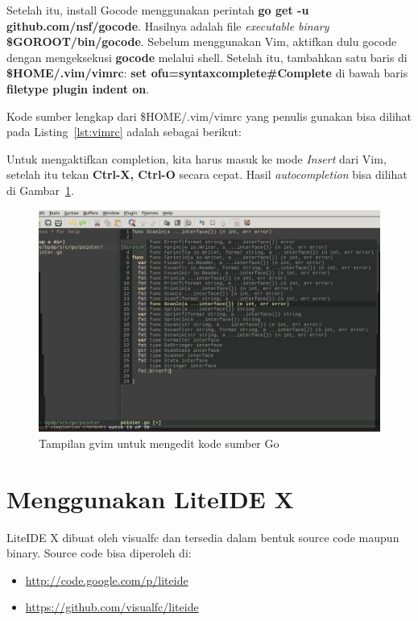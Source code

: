 Setelah itu, install Gocode menggunakan perintah \textbf{go get -u github.com/nsf/gocode}. Hasilnya adalah file \textit{executable binary} \textbf{\$GOROOT/bin/gocode}. Sebelum menggunakan Vim, aktifkan dulu gocode dengan mengeksekusi \textbf{gocode} melalui shell. Setelah itu, tambahkan satu baris di \textbf{\$HOME/.vim/vimrc}: \textbf{set ofu=syntaxcomplete\#Complete} di bawah baris \textbf{filetype plugin indent on}.

Kode sumber lengkap dari \$HOME/.vim/vimrc yang penulis gunakan bisa dilihat pada Listing~\ref{lst:vimrc} adalah sebagai berikut:



Untuk mengaktifkan completion, kita harus masuk ke mode \textit{Insert} dari Vim, setelah itu tekan \textbf{Ctrl-X, Ctrl-O} secara cepat. Hasil \textit{autocompletion} bisa dilihat di Gambar~\ref{fig:vim-go-completion}.

  \begin{figure}
    \begin{center}
      \includegraphics[scale=0.5]{images/vim-go-completion.jpg}
    \end{center}
    \caption{Tampilan gvim untuk mengedit kode sumber Go}
    \label{fig:vim-go-completion}
  \end{figure}

\section{Menggunakan LiteIDE X}

LiteIDE X dibuat oleh visualfc dan tersedia dalam bentuk source code maupun binary. Source code bisa diperoleh di:
\begin{itemize}
  \item \url{http://code.google.com/p/liteide}
  \item \url{https://github.com/visualfc/liteide}
\end{itemize}

